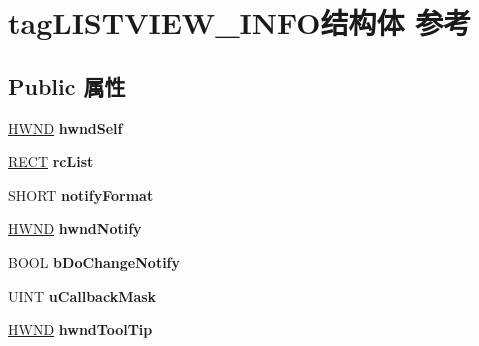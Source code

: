\hypertarget{structtag_l_i_s_t_v_i_e_w___i_n_f_o}{}\section{tag\+L\+I\+S\+T\+V\+I\+E\+W\+\_\+\+I\+N\+F\+O结构体 参考}
\label{structtag_l_i_s_t_v_i_e_w___i_n_f_o}
\subsection*{Public 属性}
\begin{DoxyCompactItemize}
\item 
\mbox{\label{structtag_l_i_s_t_v_i_e_w___i_n_f_o_afc05401f305fea4f8b2421ba8576ec5b}} 
\hyperlink{interfacevoid}{H\+W\+ND} {\bfseries hwnd\+Self}
\item 
\mbox{\label{structtag_l_i_s_t_v_i_e_w___i_n_f_o_ac3f472f28a083c7ca053957f4c0a6fec}} 
\hyperlink{structtag_r_e_c_t}{R\+E\+CT} {\bfseries rc\+List}
\item 
\mbox{\label{structtag_l_i_s_t_v_i_e_w___i_n_f_o_ae8b6278eef5029949b8cc6d27dca3c89}} 
S\+H\+O\+RT {\bfseries notify\+Format}
\item 
\mbox{\label{structtag_l_i_s_t_v_i_e_w___i_n_f_o_a8615f658fd4322b367f6aacedf05ad96}} 
\hyperlink{interfacevoid}{H\+W\+ND} {\bfseries hwnd\+Notify}
\item 
\mbox{\label{structtag_l_i_s_t_v_i_e_w___i_n_f_o_a2371b0fd0823ca26e23a1c7d82141725}} 
B\+O\+OL {\bfseries b\+Do\+Change\+Notify}
\item 
\mbox{\label{structtag_l_i_s_t_v_i_e_w___i_n_f_o_a3427de80be0491b6a1d4fb26c6068281}} 
U\+I\+NT {\bfseries u\+Callback\+Mask}
\item 
\mbox{\label{structtag_l_i_s_t_v_i_e_w___i_n_f_o_add4f2eaa74747bc4bb61604dda1823a1}} 
\hyperlink{interfacevoid}{H\+W\+ND} {\bfseries hwnd\+Tool\+Tip}
\item 
\mbox{\label{structtag_l_i_s_t_v_i_e_w___i_n_f_o_aa914b1aa295f595c9d05965d7a6cb9f1}} 

\end{DoxyCompactItemize}
